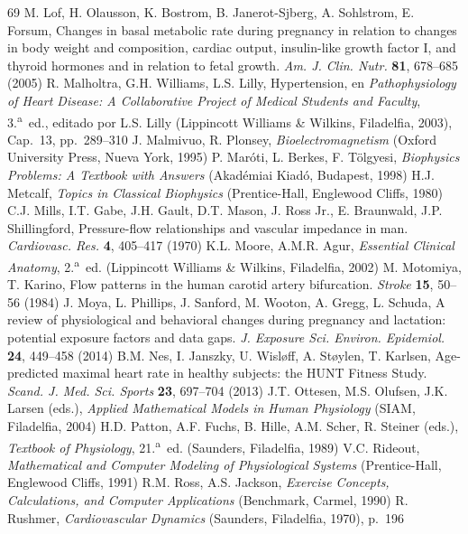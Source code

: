 \documentclass[12pt]{book}
\begin{document}
\begin{thebibliography}{69}
 M. Lof, H. Olausson, K. Bostrom, B. Janerot-Sjberg, A. Sohlstrom, E. Forsum, Changes in basal metabolic rate during pregnancy in relation to changes in body weight and composition, cardiac output, insulin-like growth factor I, and thyroid hormones and in relation to fetal growth. \textit{Am. J. Clin. Nutr.} \textbf{81}, 678--685 (2005)
 R. Malholtra, G.H. Williams, L.S. Lilly, Hypertension, en \textit{Pathophysiology of Heart Disease: A Collaborative Project of Medical Students and Faculty}, 3.\textsuperscript{a}~ed., editado por L.S. Lilly (Lippincott Williams \& Wilkins, Filadelfia, 2003), Cap.~13, pp.~289--310
 J. Malmivuo, R. Plonsey, \textit{Bioelectromagnetism} (Oxford University Press, Nueva York, 1995)
 P. Maróti, L. Berkes, F. Tölgyesi, \textit{Biophysics Problems: A Textbook with Answers} (Akadémiai Kiadó, Budapest, 1998)
 H.J. Metcalf, \textit{Topics in Classical Biophysics} (Prentice-Hall, Englewood Cliffs, 1980)
 C.J. Mills, I.T. Gabe, J.H. Gault, D.T. Mason, J. Ross Jr., E. Braunwald, J.P. Shillingford, Pressure-flow relationships and vascular impedance in man. \textit{Cardiovasc. Res.} \textbf{4}, 405--417 (1970)
 K.L. Moore, A.M.R. Agur, \textit{Essential Clinical Anatomy}, 2.\textsuperscript{a}~ed. (Lippincott Williams \& Wilkins, Filadelfia, 2002)
 M. Motomiya, T. Karino, Flow patterns in the human carotid artery bifurcation. \textit{Stroke} \textbf{15}, 50--56 (1984)
 J. Moya, L. Phillips, J. Sanford, M. Wooton, A. Gregg, L. Schuda, A review of physiological and behavioral changes during pregnancy and lactation: potential exposure factors and data gaps. \textit{J. Exposure Sci. Environ. Epidemiol.} \textbf{24}, 449--458 (2014)
 B.M. Nes, I. Janszky, U. Wisløff, A. Støylen, T. Karlsen, Age-predicted maximal heart rate in healthy subjects: the HUNT Fitness Study. \textit{Scand. J. Med. Sci. Sports} \textbf{23}, 697--704 (2013)
 J.T. Ottesen, M.S. Olufsen, J.K. Larsen (eds.), \textit{Applied Mathematical Models in Human Physiology} (SIAM, Filadelfia, 2004)
 H.D. Patton, A.F. Fuchs, B. Hille, A.M. Scher, R. Steiner (eds.), \textit{Textbook of Physiology}, 21.\textsuperscript{a}~ed. (Saunders, Filadelfia, 1989)
 V.C. Rideout, \textit{Mathematical and Computer Modeling of Physiological Systems} (Prentice-Hall, Englewood Cliffs, 1991)
 R.M. Ross, A.S. Jackson, \textit{Exercise Concepts, Calculations, and Computer Applications} (Benchmark, Carmel, 1990)
 R. Rushmer, \textit{Cardiovascular Dynamics} (Saunders, Filadelfia, 1970), p.~196

\end{thebibliography}
\end{document}
